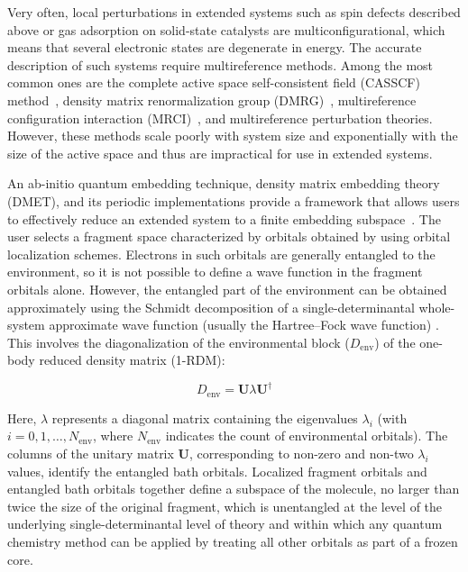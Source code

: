 Very often, local perturbations in extended systems such as spin defects described above or gas adsorption on solid-state catalysts are multiconfigurational, which means that several electronic states are degenerate in energy.
The accurate description of such systems require multireference methods. Among the most common ones are the complete active space self-consistent field (CASSCF) method~\cite{CASSCF0,CASSCF1,CASSCF2}, density matrix renormalization group (DMRG)~\cite{White1992}, multireference configuration interaction (MRCI)~\cite{Buenker1974}, and multireference perturbation theories.
However, these methods scale poorly with system size and exponentially with the size of the active space and thus are impractical for use in extended systems.

An ab-initio quantum embedding technique, density matrix embedding theory (DMET), \cite{DMET,DMET_mol,DMETpractical,5years_of_DMET}and its periodic implementations provide a framework that allows users to effectively reduce an extended system to a finite embedding subspace~\cite{pham2019periodic,cui2020efficient}.
The user selects a fragment space characterized by orbitals obtained by using orbital localization schemes. Electrons in such orbitals are generally entangled to the environment, so it is not possible to define a wave function in the fragment orbitals alone. However, the entangled part of the environment can be obtained approximately using the Schmidt decomposition of a single-determinantal whole-system approximate wave function (usually the Hartree--Fock wave function) \cite{DMETpractical}. This involves the diagonalization of the environmental block ($D_{\text{env}}$) of the one-body reduced density matrix (1-RDM):

\begin{equation}
D_{\text{env}} = \mathbf{U} \lambda \mathbf{U}^\dagger
\label{eq:SVD}
\end{equation}

Here, $\lambda$ represents a diagonal matrix containing the eigenvalues $\lambda_i$ (with $i = 0, 1, \ldots, N_{\text{env}}$, where $N_{\text{env}}$ indicates the count of environmental orbitals). The columns of the unitary matrix $\mathbf{U}$, corresponding to non-zero and non-two $\lambda_i$ values, identify the entangled bath orbitals. Localized fragment orbitals and entangled bath orbitals together define a subspace of the molecule, no larger than twice the size of the original fragment, which is unentangled at the level of the underlying single-determinantal level of theory and within which any quantum chemistry method can be applied by treating all other orbitals as part of a frozen core.

